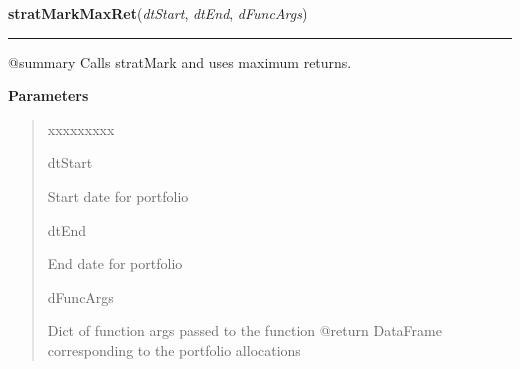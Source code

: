 \hspace{.8\funcindent}\begin{boxedminipage}{\funcwidth}

    \raggedright \textbf{stratMarkMaxRet}(\textit{dtStart}, \textit{dtEnd}, \textit{dFuncArgs})

    \vspace{-1.5ex}

    \rule{\textwidth}{0.5\fboxrule}
\setlength{\parskip}{2ex}
    @summary Calls stratMark and uses maximum returns.

\setlength{\parskip}{1ex}
      \textbf{Parameters}
      \vspace{-1ex}

      \begin{quote}
        \begin{Ventry}{xxxxxxxxx}

          \item[dtStart]

          Start date for portfolio

          \item[dtEnd]

          End date for portfolio

          \item[dFuncArgs]

          Dict of function args passed to the function @return DataFrame 
          corresponding to the portfolio allocations

        \end{Ventry}

      \end{quote}

    \end{boxedminipage}

    \label{QSTK:qstkstrat:strategies:stratMarkMinRet}

    \vspace{0.5ex}

